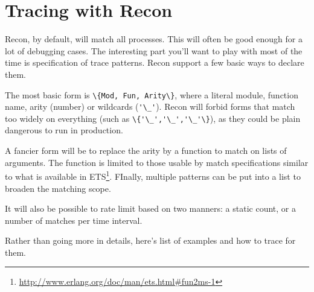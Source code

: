 \documentclass[11pt, oneside]{book}   	%
\newcommand{\expression}[1]{\Verb`#1`}
\begin{document}
\section{Tracing with Recon}

Recon, by default, will match all processes. This will often be good enough for a lot of debugging cases. The interesting part you'll want to play with most of the time is specification of trace patterns. Recon support a few basic ways to declare them. 

The most basic form is \expression{\{Mod, Fun, Arity\}}, where a literal module, function name, arity (number) or wildcards (\expression{'\_'}). Recon will forbid forms that match too widely on everything (such as \expression{\{'\_','\_','\_'\}}), as they could be plain dangerous to run in production.

A fancier form will be to replace the arity by a function to match on lists of arguments. The function is limited to those usable by match specifications similar to what is available in ETS\footnote{\href{http://www.erlang.org/doc/man/ets.html\#fun2ms-1}{http://www.erlang.org/doc/man/ets.html\#fun2ms-1}}. FInally, multiple patterns can be put into a list to broaden the matching scope.

It will also be possible to rate limit based on two manners: a static count, or a number of matches per time interval.

Rather than going more in details, here's list of examples and how to trace for them.
\end{document}
